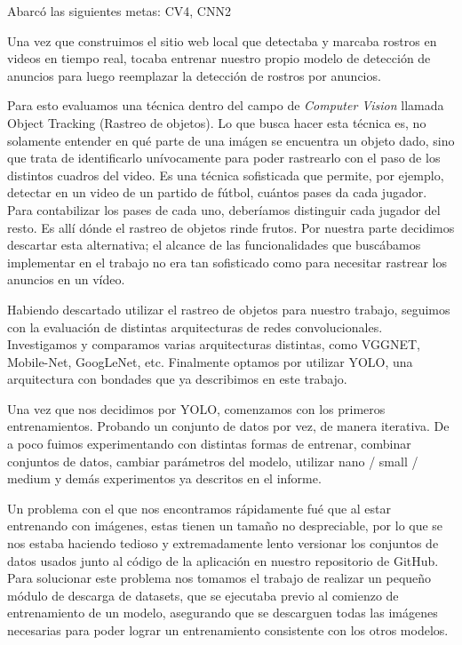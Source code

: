 \documentclass[a4paper]{article}
\begin{document}
Abarcó las siguientes metas: CV4, CNN2

Una vez que construimos el sitio web local que detectaba y marcaba rostros en videos en tiempo real, tocaba entrenar nuestro propio modelo de detección de anuncios para luego reemplazar la detección de rostros por anuncios.

Para esto evaluamos una técnica dentro del campo de \textit{Computer Vision} llamada Object Tracking (Rastreo de objetos). Lo que busca hacer esta técnica es, no solamente entender en qué parte de una imágen se encuentra un objeto dado, sino que trata de identificarlo unívocamente para poder rastrearlo con el paso de los distintos cuadros del video.
Es una técnica sofisticada que permite, por ejemplo, detectar en un video de un partido de fútbol, cuántos pases da cada jugador. Para contabilizar los pases de cada uno, deberíamos distinguir cada jugador del resto. Es allí dónde el rastreo de objetos rinde frutos.
Por nuestra parte decidimos descartar esta alternativa; el alcance de las funcionalidades que buscábamos implementar en el trabajo no era tan sofisticado como para necesitar rastrear los anuncios en un vídeo.

Habiendo descartado utilizar el rastreo de objetos para nuestro trabajo, seguimos con la evaluación de distintas arquitecturas de redes convolucionales. Investigamos y comparamos varias arquitecturas distintas, como VGGNET, Mobile-Net, GoogLeNet, etc. Finalmente optamos por utilizar YOLO, una arquitectura con bondades que ya describimos en este trabajo.

Una vez que nos decidimos por YOLO, comenzamos con los primeros entrenamientos. Probando un conjunto de datos por vez, de manera iterativa. De a poco fuimos experimentando con distintas formas de entrenar, combinar conjuntos de datos, cambiar parámetros del modelo, utilizar nano / small / medium y demás experimentos ya descritos en el informe.

Un problema con el que nos encontramos rápidamente fué que al estar entrenando con imágenes, estas tienen un tamaño no despreciable, por lo que se nos estaba haciendo tedioso y extremadamente lento versionar los conjuntos de datos usados junto al código de la aplicación en nuestro repositorio de GitHub. Para solucionar este problema nos tomamos el trabajo de realizar un pequeño módulo de descarga de datasets, que se ejecutaba previo al comienzo de entrenamiento de un modelo, asegurando que se descarguen todas las imágenes necesarias para poder lograr un entrenamiento consistente con los otros modelos.
\end{document}

